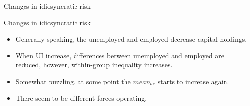 \documentclass{beamer}
\begin{document}
\begin{frame}{Changes in idiosyncratic risk}



\end{frame}



\begin{frame}{Changes in idiosyncratic risk}

\begin{itemize} 


	\item {
Generally speaking, the unemployed and employed decrease capital holdings. 
}
	\item {
 When UI increase, differences between unemployed and employed are reduced, however, within-group inequality increases.
}
	\item {
Somewhat puzzling, at some point the $mean_{ue}$ starts to increase again.
}
	\item {
There seem to be different forces operating. 
}

\end{itemize}


\end{frame}
\end{document}
